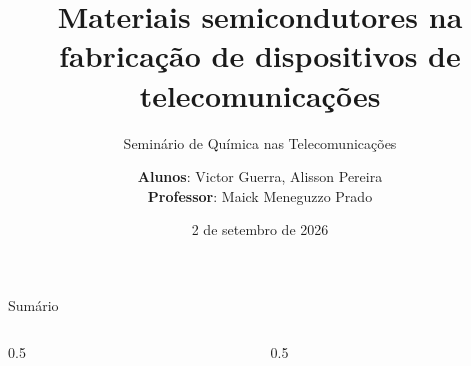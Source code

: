 \documentclass[aspectratio=169,11pt]{beamer}
\title[Semicondutores em Telecom]{Materiais semicondutores na fabricação de dispositivos de telecomunicações}
\subtitle{Seminário de Química nas Telecomunicações}
\author[Victor Guerra, Alisson Pereira]{%
  \textbf{Alunos}: Victor Guerra, Alisson Pereira \\
  \textbf{Professor}: Maick Meneguzzo Prado}
\institute[IFSC]{\small IFSC, Câmpus São José \\ Engenharia de Telecomunicações}
\date{2 de setembro de 2026}
\begin{document}
\begin{frame}[plain]
  \titlepage
\end{frame}

\begin{frame}{Sumário}
  \footnotesize
  \begin{columns}[T]
    \begin{column}{0.5\linewidth}
      \tableofcontents[sections={1-4},hideallsubsections]
    \end{column}
    \begin{column}{0.5\linewidth}
      \tableofcontents[sections={5-8},hideallsubsections]
    \end{column}
  \end{columns}
\end{frame}





\end{document}
